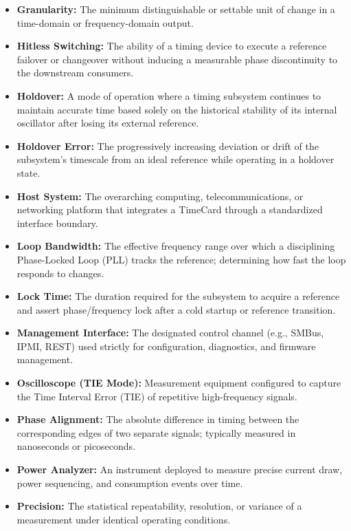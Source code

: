 \documentclass[
]{article}
\begin{document}
\begin{itemize}
  the exact signal frequency or period over a defined averaging
  interval.
\item
  \textbf{Granularity:} The minimum distinguishable or settable unit of
  change in a time-domain or frequency-domain output.
\item
  \textbf{Hitless Switching:} The ability of a timing device to execute
  a reference failover or changeover without inducing a measurable phase
  discontinuity to the downstream consumers.
\item
  \textbf{Holdover:} A mode of operation where a timing subsystem
  continues to maintain accurate time based solely on the historical
  stability of its internal oscillator after losing its external
  reference.
\item
  \textbf{Holdover Error:} The progressively increasing deviation or
  drift of the subsystem's timescale from an ideal reference while
  operating in a holdover state.
\item
  \textbf{Host System:} The overarching computing, telecommunications,
  or networking platform that integrates a TimeCard through a
  standardized interface boundary.
\item
  \textbf{Loop Bandwidth:} The effective frequency range over which a
  disciplining Phase-Locked Loop (PLL) tracks the reference; determining
  how fast the loop responds to changes.
\item
  \textbf{Lock Time:} The duration required for the subsystem to acquire
  a reference and assert phase/frequency lock after a cold startup or
  reference transition.
\item
  \textbf{Management Interface:} The designated control channel (e.g.,
  SMBus, IPMI, REST) used strictly for configuration, diagnostics, and
  firmware management.
\item
  \textbf{Oscilloscope (TIE Mode):} Measurement equipment configured to
  capture the Time Interval Error (TIE) of repetitive high-frequency
  signals.
\item
  \textbf{Phase Alignment:} The absolute difference in timing between
  the corresponding edges of two separate signals; typically measured in
  nanoseconds or picoseconds.
\item
  \textbf{Power Analyzer:} An instrument deployed to measure precise
  current draw, power sequencing, and consumption events over time.
\item
  \textbf{Precision:} The statistical repeatability, resolution, or
  variance of a measurement under identical operating conditions.

\end{itemize}
\end{document}
